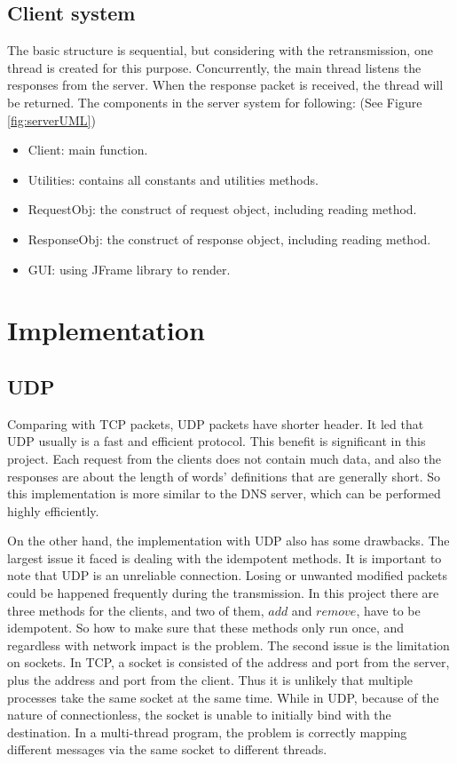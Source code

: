 \documentclass[11pt]{article}
\begin{document}
\subsection{Client system}
The basic structure is sequential, but considering with the retransmission, one thread is created for this purpose. Concurrently, the main thread listens the responses from the server. When the response packet is received, the thread will be returned. The components in the server system for following: (See Figure \ref{fig:serverUML})
\begin{itemize}
\item Client: main function.
\item Utilities: contains all constants and utilities methods.
\item RequestObj: the construct of request object, including reading method.
\item ResponseObj: the construct of response object, including reading method.
\item GUI: using JFrame library to render.
\end{itemize}


\section{Implementation}

\subsection{UDP}
Comparing with TCP packets, UDP packets have shorter header. It led that UDP usually is a fast and efficient protocol. This benefit is significant in this project. Each request from the clients does not contain much data, and also the responses are about the length of words' definitions that are generally short. So this implementation is more similar to the DNS server, which can be performed highly efficiently.

On the other hand, the implementation with UDP also has some drawbacks. The largest issue it faced is dealing with the idempotent methods. It is important to note that UDP is an unreliable connection. Losing or unwanted modified packets could be happened frequently during the transmission. In this project there are three methods for the clients, and two of them, $add$ and $remove$, have to be idempotent. So how to make sure that these methods only run once, and regardless with network impact is the problem. The second issue is the limitation on sockets. In TCP, a socket is consisted of the address and port from the server, plus the address and port from the client. Thus it is unlikely that multiple processes take the same socket at the same time. While in UDP, because of the nature of connectionless, the socket is unable to initially bind with the destination. In a multi-thread program, the problem is correctly mapping different messages via the same socket to different threads.
\end{document}
